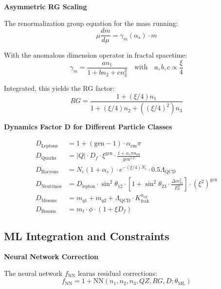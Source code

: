 	\textbf{Asymmetric RG Scaling}
	
	The renormalization group equation for the mass running:
	\begin{equation}
		\mu \frac{dm}{d\mu} = \gamma_m(\alpha_s) \cdot m
	\end{equation}
	
	With the anomalous dimension operator in fractal spacetime:
	\begin{equation}
		\gamma_m = \frac{a n_1}{1 + b n_2 + c n_3^2} \quad \text{with} \quad a,b,c \propto \frac{\xi}{4}
	\end{equation}
	
	Integrated, this yields the RG factor:
	\begin{equation}
		RG = \frac{1 + (\xi/4) n_1}{1 + (\xi/4) n_2 + ((\xi/4)^2) n_3}
	\end{equation}
	
	\textbf{Dynamics Factor D for Different Particle Classes}
	
	\begin{align}
		D_{\text{Leptons}} &= 1 + (\text{gen} - 1) \cdot \alpha_{\text{em}} \pi \\
		D_{\text{Quarks}} &= |Q| \cdot D_f \cdot \xi^{\text{gen}} \cdot \frac{1 + \alpha_s \pi n_{\text{eff}}}{\text{gen}^{1.2}} \\
		D_{\text{Baryons}} &= N_c (1 + \alpha_s) \cdot e^{-(\xi/4) N_c} \cdot 0.5 \Lambda_{\text{QCD}} \\
		D_{\text{Neutrinos}} &= D_{\text{lepton}} \cdot \sin^2 \theta_{12} \cdot \left[1 + \sin^2 \theta_{23} \cdot \frac{\Delta m^2_{21}}{E_0^2}\right] \cdot (\xi^2)^{\text{gen}} \\
		D_{\text{Mesons}} &= m_{q1} + m_{q2} + \Lambda_{\text{QCD}} \cdot K_{\text{frak}}^{n_{\text{eff}}} \\
		D_{\text{Bosons}} &= m_t \cdot \phi \cdot (1 + \xi D_f)
	\end{align}
	
	\subsection{ML Integration and Constraints}
	
	\textbf{Neural Network Correction}
	
	The neural network $f_{\text{NN}}$ learns residual corrections:
	\begin{equation}
		f_{\text{NN}} = 1 + \text{NN}(n_1, n_2, n_3, QZ, RG, D; \theta_{\text{ML}})
	\end{equation}
	
